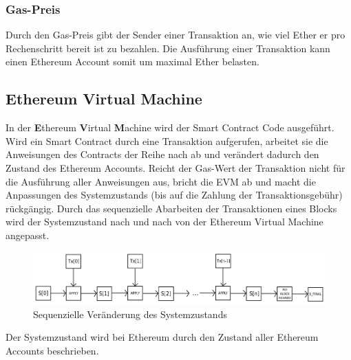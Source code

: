 \subsubsection{Gas-Preis}
Durch den Gas-Preis gibt der Sender einer Transaktion an, wie viel Ether er pro Rechenschritt bereit ist zu bezahlen. Die Ausführung einer Transaktion kann einen Ethereum Account somit um maximal  Ether belasten.

\subsection{Ethereum Virtual Machine}\label{eth_evm} 
In der \textbf{E}thereum \textbf{V}irtual \textbf{M}achine wird der Smart Contract Code ausgeführt. Wird ein Smart Contract durch eine Transaktion aufgerufen, arbeitet sie die Anweisungen des Contracts der Reihe nach ab und verändert dadurch den Zustand des Ethereum Accounts. Reicht der Gas-Wert der Transaktion nicht für die Ausführung aller Anweisungen aus, bricht die EVM ab und macht die Anpassungen des Systemzustands (bis auf die Zahlung der Transaktionsgebühr) rückgängig. Durch das sequenzielle Abarbeiten der Transaktionen eines Blocks wird der Systemzustand nach und nach von der Ethereum Virtual Machine angepasst.
\begin{figure}[H]
\centering
\includegraphics[width=1\linewidth]{Figures/eth/ETH_txn_statetransformation}
\decoRule
\caption{Sequenzielle Veränderung des Systemzustands \cite{ethereum_white_paper}}
\label{fig:ETH_txn_statetransformation}
\end{figure}
Der Systemzustand wird bei Ethereum durch den Zustand aller Ethereum Accounts beschrieben. 

